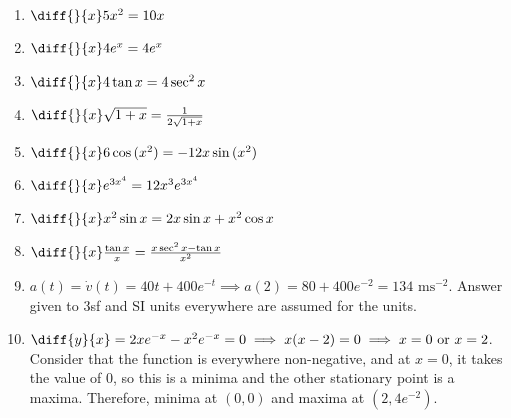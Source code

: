 \documentclass{article}
\begin{document}
\begin{enumerate}
    \item $\diff{}{x} 5x^2= 10x$
    \item $\diff{}{x} 4e^x = 4e^x$
    \item $\diff{}{x} 4 \tan{x} = 4 \sec^2{x}$
    \item $\diff{}{x} \sqrt{1+x} = \frac{1}{2\sqrt{1+x}}$
    \item $\diff{}{x} 6 \cos{(x^2)}= -12x \sin{(x^2)}$
    \item $\diff{}{x} e^{3x^4} = 12 x^3 e^{3x^4}$
    \item $\diff{}{x} x^2 \sin{x} = 2x \sin{x} + x^2 \cos{x}$
    \item $\diff{}{x} \frac{\tan{x}}{x} = \frac{x \sec^2{x} - \tan{x}}{x^2}$
    \item $a(t)=\dot{v}(t) = 40t+400 e^{-t} \implies a(2)=80+400 e^{-2} = 134 \text{ ms}^{-2}$. Answer given to 3sf and SI units everywhere are assumed for the units.
    \item $\diff{y}{x}=2xe^{-x} - x^2 e^{-x}=0 \implies x(x-2)=0 \implies x=0 \text{ or } x=2$. Consider that the function is everywhere non-negative, and at $x=0$, it takes the value of $0$, so this is a minima and the other stationary point is a maxima. Therefore, minima at $(0,0)$ and maxima at $(2,4e^{-2})$.

\end{enumerate}
\end{document}
